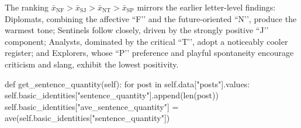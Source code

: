 \documentclass[12pt]{article}
\begin{document}
	The ranking $\bar{x}_{\text{NF}}>\bar{x}_{\text{SJ}}>\bar{x}_{\text{NT}}>\bar{x}_{\text{SP}}$ mirrors the earlier letter-level findings: Diplomats, combining the affective “F’’ and the future-oriented “N’’, produce the warmest tone; Sentinels follow closely, driven by the strongly positive “J’’ component; Analysts, dominated by the critical “T’’, adopt a noticeably cooler register; and Explorers, whose “P’’ preference and playful spontaneity encourage criticism and slang, exhibit the lowest positivity. 
	


	
	

	\begin{python}
def get_sentence_quantity(self):
    for post in self.data["posts"].values:
        self.basic_identities["sentence_quantity"].append(len(post))
    self.basic_identities["ave_sentence_quantity"] = ave(self.basic_identities["sentence_quantity"])
	\end{python}
	
	

	
	
\end{document}

